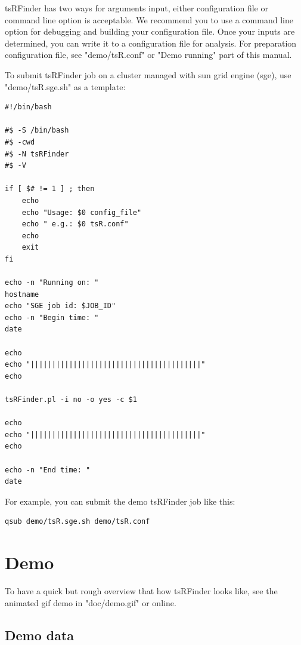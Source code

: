 \documentclass[11pt, a4paper]{article}
\begin{document}
tsRFinder has two ways for arguments input, either configuration file or command line option is acceptable. We recommend you to use a command line option for debugging and building your configuration file. Once your inputs are determined, you can write it to a configuration file for analysis. For preparation configuration file, see "demo/tsR.conf" or "Demo running" part of this manual.

To submit tsRFinder job on a cluster managed with sun grid engine (sge), use "demo/tsR.sge.sh" as a template:

{\scriptsize \begin{tcolorbox}[colback=blue!5!white,colframe=pink!75!black,title=demo/tsR.sge.sh]
\begin{verbatim}
#!/bin/bash

#$ -S /bin/bash
#$ -cwd
#$ -N tsRFinder
#$ -V

if [ $# != 1 ] ; then
	echo
	echo "Usage: $0 config_file"
	echo " e.g.: $0 tsR.conf"
	echo
	exit
fi

echo -n "Running on: "
hostname
echo "SGE job id: $JOB_ID"
echo -n "Begin time: "
date

echo
echo "||||||||||||||||||||||||||||||||||||||||"
echo

tsRFinder.pl -i no -o yes -c $1

echo
echo "||||||||||||||||||||||||||||||||||||||||"
echo

echo -n "End time: "
date
\end{verbatim}
\end{tcolorbox}}

For example, you can submit the demo tsRFinder job like this:

{\scriptsize \begin{tcolorbox}[colback=blue!5!white,colframe=pink!75!black,title=submit a demo tsRFinder job]
\begin{verbatim}
qsub demo/tsR.sge.sh demo/tsR.conf
\end{verbatim}
\end{tcolorbox}}

\section{Demo}

To have a quick but rough overview that how tsRFinder looks like, see the animated gif demo in "doc/demo.gif" or online.

\subsection{Demo data}
\end{document}
